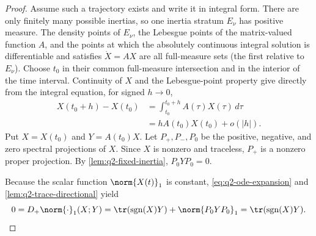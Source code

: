 \documentclass[class=article,11pt,a4paper,crop=false]{standalone}
\begin{document}
\begin{proof}
Assume such a trajectory exists and write it in integral form. There are only
finitely many possible inertias, so one inertia stratum $E_\nu$ has positive
measure. The density points of $E_\nu$, the Lebesgue points of the
matrix-valued function $A$, and the points at which the absolutely continuous
integral solution is differentiable and satisfies $\dot X=AX$ are all
full-measure sets (the first relative to $E_\nu$). Choose $t_0$ in their common
full-measure intersection and in the interior of the time interval.
Continuity of $X$ and the Lebesgue-point property give directly from the
integral equation, for signed $h\to0$,
\begin{align}
 X(t_0+h)-X(t_0)
 &=\int_{t_0}^{t_0+h}A(\tau)X(\tau)\,d\tau \\
 &=hA(t_0)X(t_0)+o(|h|).
 \label{eq:q2-ode-expansion}
\end{align}
Put $X=X(t_0)$ and $Y=A(t_0)X$. Let $P_+,P_-,P_0$ be the positive, negative,
and zero spectral projections of $X$. Since $X$ is nonzero and traceless,
$P_+$ is a nonzero proper projection. By \cref{lem:q2-fixed-inertia},
$P_0YP_0=0$.

Because the scalar function $\norm{X(t)}_1$ is constant,
\eqref{eq:q2-ode-expansion} and \cref{lem:q2-trace-directional} yield
\begin{equation}
 0=D_+\norm{\cdot}_1(X;Y)
   =\tr(\operatorname{sgn}(X)Y)+\norm{P_0YP_0}_1
   =\tr(\operatorname{sgn}(X)Y).
 \label{eq:q2-directional-zero}
\end{equation}


\end{proof}
\end{document}
